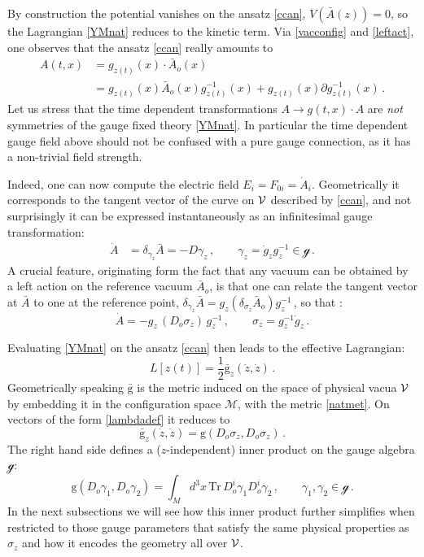 \documentclass[11pt,a4paper]{article}
\def\calsg{{\boldsymbol{\mathscr g}}}
\def\calm{{\mathcal{M}}}
\def\calv{{\cal V}}
\def\rg{{\mathrm{g}}}
\def\Tr{\mathrm{Tr}}
\def\grad{{\partial}}
\begin{document}
    By construction the potential vanishes on the ansatz \eqref{ccan}, $V(\bar{A}(z))=0$, so the Lagrangian \eqref{YMnat} reduces to the kinetic term. Via \eqref{vacconfig} and \eqref{leftact}, one observes that the ansatz \eqref{ccan} really amounts to
    \begin{align}
\nonumber    A(t,x)&=g_{z(t)}(x)\cdot\bar A_o(x)\\
    &=g_{z(t)}(x)\bar A_o(x)g_{z(t)}^{-1}(x)+g_{z(t)}(x)\grad g_{z(t)}^{-1}(x)\label{gauge fieldexpl}\,.
    \end{align}
    Let us stress that the time dependent transformations $A\to g(t,x)\cdot A$ are {\it not} symmetries of the gauge fixed theory \ref{YMnat}. In particular the time dependent gauge field above should not be confused with a pure gauge connection, as it has a non-trivial field strength.
    
    Indeed, one can now compute the electric field $E_i=F_{0i}=\dot A_i$. Geometrically it corresponds to the tangent vector of the curve on $\calv$ described by \eqref{ccan}{}, and not surprisingly it can be expressed instantaneously as an infinitesimal gauge transformation: 
    \begin{align}\label{electric field tangent}
    \dot A&=\delta_{\gamma_z}\bar A=-D\gamma_z\,, \qquad \gamma_z=\dot g_z g^{-1}_z\in \calsg\,.
    \end{align}
    A crucial feature, originating form the fact that any vacuum can be obtained by a left action on the reference vacuum $\bar A_o$, is that one can relate the tangent vector at $\bar A$ to one at the reference point, $\delta_{\gamma_z}\bar A=g_z(\delta_{\sigma_z}\bar A_o)g_z^{-1}$\,, so that :
    \begin{equation}
    \dot A=-g_z\,({D_o}\sigma_z)\,g_z^{-1}\,,\qquad \sigma_z=g_z^{-1}\dot g_z\label{lambdadef}\,.
    \end{equation}
      
    Evaluating \eqref{YMnat} on the ansatz \eqref{ccan} then leads to the effective Lagrangian:
    \begin{equation}
    L[z(t)]=\frac{1}{2}\bar{\rg}_z(\dot z,\dot z)\label{LeffYM}\,.
    \end{equation}
    Geometrically speaking $\bar{\rg}$ is the metric induced on the space of physical vacua $\calv$ by embedding it in the configuration space $\calm$, with the metric \eqref{natmet}. On vectors of the form \eqref{lambdadef} it reduces to
    \begin{equation}
    \bar{\rg}_z(\dot z ,\dot z)=\rg(D_o\sigma_z,D_o\sigma_z)\label{metric1}\,.
    \end{equation}
    The right hand side defines a ($z$-independent) inner product on the gauge algebra $\calsg$:
    \begin{equation}
    \rg(D_o\gamma_1,D_o\gamma_2)=\int_M d^3x\,\Tr\,D_{o}^i\gamma_1  D_{o}^i\gamma_2\,,\qquad \gamma_{1},\gamma_{2}\in \calsg \,.\label{scalar product YM}
    \end{equation} 
    In the next subsections we will see how this inner product further simplifies when restricted to those gauge parameters that satisfy the same physical properties as $\sigma_z$ and how it encodes the geometry all over $\calv$.
    
\end{document}

